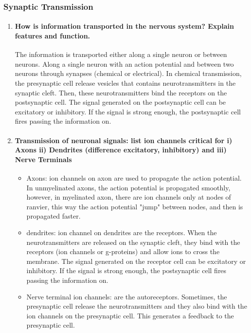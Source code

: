 \documentclass[12pt,article,oneside,a4paper]{memoir}
\begin{document}
\subsubsection{Synaptic Transmission}
\begin{enumerate}
\item \paragraph{How is information transported in the nervous system? Explain features and function.}
The information is transported either along a single neuron or between neurons. Along a single neuron with an action potential and between two neurons through synapses (chemical or electrical).
In chemical transmission, the presynaptic cell release vesicles that contains neurotransmitters in the synaptic cleft. Then, these neurotransmitters bind the receptors on the postsynaptic cell. The signal generated on the postsynaptic cell can be excitatory or inhibitory. If the signal is strong enough, the postsynaptic cell fires passing the information on.

\item \paragraph{Transmission of neuronal signals: list ion channels critical for i) Axons ii) Dendrites (difference excitatory, inhibitory) and iii) Nerve Terminals}

\begin{itemize}
\item Axons: ion channels on axon are used to propagate the action potential. In unmyelinated axons, the action potential is propagated smoothly, however, in myelinated axon, there are ion channels only at nodes of ranvier, this way the action potential "jump" between nodes, and then is propagated faster.
\item dendrites: ion channel on dendrites are the receptors. When the neurotransmitters are released on the synaptic cleft, they bind with the receptors (ion channels or g-proteins) and allow ions to cross the membrane. The signal generated on the receptor cell can be excitatory or inhibitory. If the signal is strong enough, the postsynaptic cell fires passing the information on.
\item Nerve terminal ion channels: are the autoreceptors. Sometimes, the presynaptic cell release the neurotransmitters and they also bind with the ion channels on the presynaptic cell. This generates a feedback to the presynaptic cell.
\end{itemize}


\end{enumerate}
\end{document}
